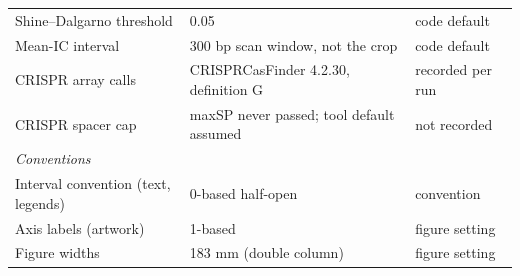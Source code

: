 {\begin{longtable}{p{}p{}p{}}
Shine--Dalgarno threshold & 0.05 & code default \\
Mean-IC interval & 300 bp scan window, not the crop & code default \\
CRISPR array calls & CRISPRCasFinder 4.2.30, definition G & recorded per run \\
CRISPR spacer cap & maxSP never passed; tool default assumed & not recorded \\
\midrule
\multicolumn{3}{l}{\textit{Conventions}} \\
Interval convention (text, legends) & 0-based half-open & convention \\
Axis labels (artwork) & 1-based & figure setting \\
Figure widths & 183 mm (double column) & figure setting \\
\end{longtable}
}
